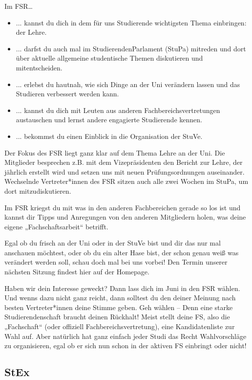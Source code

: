 \documentclass[
	10pt,
	a5paper,
	twoside
	]
	{book}
\begin{document}
Im FSR…

\begin{itemize}
	\item ... kannst du dich in dem für uns Studierende wichtigsten Thema einbringen: der Lehre.
	\item ... darfst du auch mal im StudierendenParlament (StuPa) mitreden und dort über aktuelle allgemeine studentische Themen diskutieren und mitentscheiden.
	\item ... erlebst du hautnah, wie sich Dinge an der Uni verändern lassen und das Studieren verbessert werden kann.
	\item ... kannst du dich mit Leuten aus anderen Fachbereichsvertretungen austauschen und lernst andere engagierte Studierende kennen.
	\item ... bekommst du einen Einblick in die Organisation der StuVe.
\end{itemize}

Der Fokus des FSR liegt ganz klar auf dem Thema Lehre an der Uni. Die Mitglieder besprechen z.B. mit dem Vizepräsidenten den Bericht zur Lehre, der jährlich erstellt wird und setzen uns mit neuen Prüfungsordnungen auseinander. Wechselnde Vertreter*innen des FSR sitzen auch alle zwei Wochen im StuPa, um dort mitzudiskutieren.

Im FSR kriegst du mit was in den anderen Fachbereichen gerade so los ist und kannst dir Tipps und Anregungen von den anderen Mitgliedern holen, was deine eigene „Fachschaftsarbeit“ betrifft.

Egal ob du frisch an der Uni oder in der StuVe bist und dir das nur mal anschauen möchtest, oder ob du ein alter Hase bist, der schon genau weiß was verändert werden soll, schau doch mal bei uns vorbei! Den Termin unserer nächsten Sitzung findest hier auf der Homepage.

Haben wir dein Interesse geweckt? Dann lass dich im Juni in den FSR wählen. Und wenns dazu nicht ganz reicht, dann solltest du den deiner Meinung nach besten Vertreter*innen deine Stimme geben. Geh wählen – Denn eine starke Studierendenschaft braucht deinen Rückhalt!
Meist stellt deine FS, also die „Fachschaft“ (oder offiziell Fachbereichsvertretung), eine Kandidatenliste zur Wahl auf. Aber natürlich hat ganz einfach jeder Studi das Recht Wahlvorschläge zu organisieren, egal ob er sich nun schon in der aktiven FS einbringt oder nicht!


\subsection{StEx}
\end{document}
